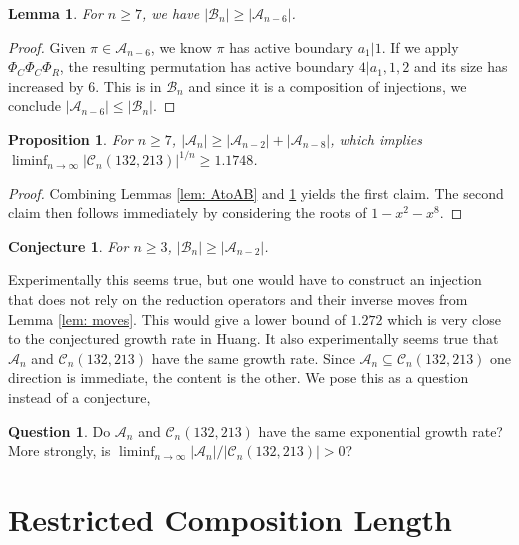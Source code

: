 \documentclass[11pt]{article}
\newcommand\A{\mathcal A}
\newcommand\cB{\mathcal B}
\newcommand\C{\mathcal C}
\newtheorem{lemma}[theorem]{Lemma}
\newtheorem{proposition}[theorem]{Proposition}
\newtheorem{conjecture}[theorem]{Conjecture}
\theoremstyle{definition}
\newtheorem{question}[theorem]{Question}
\begin{document}
\begin{lemma} \label{lem: BbelowA}
    For $n \geq 7$, we have $|\cB_{n}| \geq |\A_{n-6}|$.
\end{lemma}

\begin{proof}
    Given $\pi \in \A_{n-6}$, we know $\pi$ has active boundary $a_1|1$. If we apply $\Phi_C\Phi_C\Phi_R$, the resulting permutation has active boundary $4|a_1,1,2$ and its size has increased by $6$. This is in $\cB_n$ and since it is a composition of injections, we conclude $|\A_{n-6}| \le |\cB_n|$.
\end{proof}

\begin{proposition}
    For $n \geq 7$, $|\A_n| \ge |\A_{n-2}| + |\A_{n-8}|$, which implies $\liminf_{n \to \infty} |\C_{n}(132,213)|^{1/n} \geq 1.1748$.
\end{proposition}

\begin{proof}
    Combining Lemmas \ref{lem: AtoAB} and \ref{lem: BbelowA} yields the first claim. The second claim then follows immediately by considering the roots of $1-x^2-x^8$.
\end{proof}

\begin{conjecture} \label{conj: A-B-conj}
    For $n \geq 3$, $|\cB_n| \ge |\A_{n-2}|$.
\end{conjecture}

Experimentally this seems true, but one would have to construct an injection that does not rely on the reduction operators and their inverse moves from Lemma \ref{lem: moves}. This would give a lower bound of $1.272$ which is very close to the conjectured growth rate in Huang. It also experimentally seems true that $\A_n$ and $\C_n(132,213)$ have the same growth rate. Since $\A_n \subseteq \C_n(132,213)$ one direction is immediate, the content is the other. We pose this as a question instead of a conjecture,

\begin{question} \label{Q: C-to-A-growth}
    Do $\A_n$ and $\C_n(132,213)$ have the same exponential growth rate? More strongly, is $\liminf_{n \to \infty} |\A_n|/|\C_n(132,213)| > 0$?
\end{question}

\section{Restricted Composition Length} \label{sec: restricted-parts}
\end{document}
